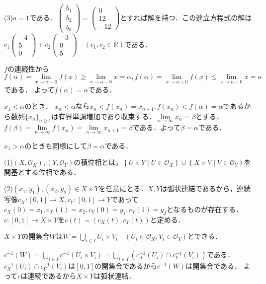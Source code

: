 \documentclass[
		book,
		head_space=20mm,
		foot_space=20mm,
		gutter=10mm,
		line_length=190mm
]{jlreq}
\begin{document}
(3)$a=1$である．$\begin{pmatrix}
    b_1 \\
    b_2 \\
    b_3
\end{pmatrix}=\begin{pmatrix}
    0 \\
    12 \\
    -12
\end{pmatrix}$とすれば解を持つ．この連立方程式の解は
$c_1\begin{pmatrix}
    -4 \\
    5 \\
    0
\end{pmatrix}+c_2\begin{pmatrix}
    -3 \\
    0 \\
    5
\end{pmatrix} \quad(c_1,c_2 \in \mathbb{R})$である．

$f$の連続性から$f(\alpha)=\lim\limits_{x\to\alpha-0}f(x)\ge\lim\limits_{x\to\alpha-0}x=\alpha,f(\alpha)=\lim\limits_{x\to\alpha+0}f(x)\le\lim\limits_{x\to\alpha+0}x=\alpha$である．
よって$f(\alpha)=\alpha$である．

$x_1 < \alpha$のとき．
$x_n < \alpha$なら$x_n<f(x_n)=x_{n+1},f(x_n)<f(\alpha)=\alpha$であるから数列$\{x_n\}_{n\ge 1}$は有界単調増加であり収束する．$\lim\limits_{n\to\infty}x_n=\beta$とする．$f(\beta)=\lim\limits_{n\to\infty}f(x_n)=\lim\limits_{n\to\infty}x_{n+1}=\beta$である．よって$\beta=\alpha$である．

$x_1 > \alpha$のときも同様にして$\beta=\alpha$である．

(1)$(X,\mathcal{O}_X),(Y,\mathcal{O}_Y)$の積位相とは，$\left\{ U \times Y\mid U \in \mathcal{O}_X \right\}\cup \left\{ X \times V \mid V \in \mathcal{O}_Y \right\}$を開基とする位相である．

(2)$(x_1,y_1),(x_2,y_2)\in X\times Y$を任意にとる．$X,Y$は弧状連結であるから，連続写像$c_X \colon [0,1]\rightarrow X,c_Y \colon [0,1]\rightarrow Y$であって$c_X(0)=x_1,c_X(1)=x_2,c_Y(0)=y_1,c_Y(1)=y_2$となるものが存在する．
$c\colon [0,1]\rightarrow X\times Y$を$c(t)=(c_X(t),c_Y(t))$と定める．

$X\times Y$の開集合$W$は$W=\bigcup\limits_{i\in I}U_i\times V_i\quad (U_i\in \mathcal{O}_X,V_i\in \mathcal{O}_Y)$とできる．

$c^{-1}(W)=\bigcup\limits_{i \in I}c^{-1}(U_i \times V_i)=\bigcup\limits_{i \in I}(c_X^{-1}(U_i)\cap c_Y^{-1}(V_i))$である．$c_X^{-1}(U_i)\cap c_Y^{-1}(V_i)$は$[0,1]$の開集合であるから$c^{-1}(W)$は開集合である．
よって$c$は連続であるから$X\times Y$は弧状連結．
\end{document}

